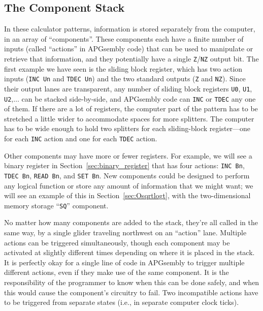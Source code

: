 \subsection{The Component Stack}

In these calculator patterns, information is stored separately from the computer, in an array of ``components''. These components each have a finite number of inputs (called ``actions'' in APGsembly code) that can be used to manipulate or retrieve that information, and they potentially have a single \texttt{Z}/\texttt{NZ} output bit. The first example we have seen is the sliding block register, which has two action inputs (\texttt{INC Un} and \texttt{TDEC Un}) and the two standard outputs (\texttt{Z} and \texttt{NZ}). Since their output lanes are transparent, any number of sliding block registers \texttt{U0}, \texttt{U1}, \texttt{U2},$\ldots$ can be stacked side-by-side, and APGsembly code can \texttt{INC} or \texttt{TDEC} any one of them. If there are a lot of registers, the computer part of the pattern has to be stretched a little wider to accommodate spaces for more splitters. The computer has to be wide enough to hold two splitters for each sliding-block register---one for each \texttt{INC} action and one for each \texttt{TDEC} action.

Other components may have more or fewer registers. For example, we will see a binary register in Section~\ref{sec:binary_register} that has four actions: \texttt{INC Bn}, \texttt{TDEC Bn}, \texttt{READ Bn}, and \texttt{SET Bn}. New components could be designed to perform any logical function or store any amount of information that we might want; we will see an example of this in Section~\ref{sec:Osqrtlogt}, with the two-dimensional memory storage ``\texttt{SQ}'' component.

No matter how many components are added to the stack, they're all called in the same way, by a single glider traveling northwest on an ``action'' lane. Multiple actions can be triggered simultaneously, though each component may be activated at slightly different times depending on where it is placed in the stack. It is perfectly okay for a single line of code in APGsembly to trigger multiple different actions, even if they make use of the same component. It is the responsibility of the programmer to know when this can be done safely, and when this would cause the component's circuitry to fail. Two incompatible actions have to be triggered from separate states (i.e., in separate computer clock ticks).


